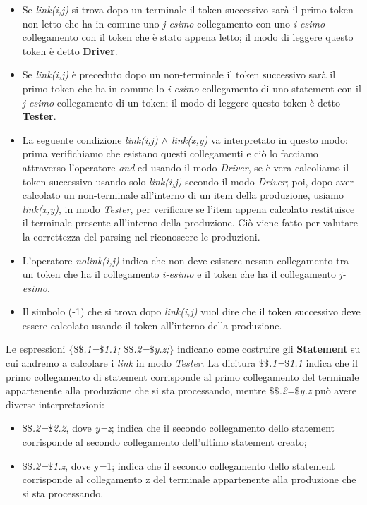 \begin{itemize}
	\item Se \textit{link(i,j)} si trova dopo un terminale il token successivo sarà il primo token non letto che ha in comune uno \textit{j-esimo} collegamento con uno \textit{i-esimo} collegamento con il token che è stato appena letto; il modo di leggere questo token è detto \textbf{Driver}.
	\item Se \textit{link(i,j)} è preceduto dopo un non-terminale il token successivo sarà il primo token che ha in comune lo \textit{i-esimo} collegamento di uno statement con il \textit{j-esimo} collegamento di un token; il modo di leggere questo token è detto \textbf{Tester}.
	\item La seguente condizione \textit{link(i,j) $\wedge$ link(x,y)} va interpretato in questo modo: prima verifichiamo che esistano questi collegamenti e ciò lo facciamo attraverso l'operatore \textit{and} ed usando il modo \textit{Driver}, se è vera calcoliamo il token successivo usando solo \textit{link(i,j)} secondo il modo \textit{Driver}; poi, dopo aver calcolato un non-terminale all'interno di un item della produzione, usiamo \textit{link(x,y)}, in modo \textit{Tester}, per verificare se l'item appena calcolato restituisce il terminale presente all'interno della produzione. Ciò viene fatto per valutare la correttezza del parsing nel riconoscere le produzioni.
	\item L'operatore \textit{nolink(i,j)} indica che non deve esistere nessun collegamento tra un token che ha il collegamento \textit{i-esimo} e il token che ha il collegamento \textit{j-esimo}.
	\item Il simbolo (-1) che si trova dopo \textit{link(i,j)} vuol dire che il token successivo deve essere calcolato usando il token all'interno della produzione.
\end{itemize} 
Le espressioni \textit{$\{$$\$\$$.1=$\$$1.1; $\$\$$.2=$\$$y.z;$\}$} indicano come costruire gli \textbf{Statement} su cui andremo a calcolare i \textit{link} in modo \textit{Tester}. La dicitura \textit{$\$\$$.1=$\$$1.1} indica che il primo collegamento di statement corrisponde al primo collegamento del terminale appartenente alla produzione che si sta processando, mentre \textit{$\$\$$.2=$\$$y.z} può avere diverse interpretazioni:
\begin{itemize}
	\item \textit{$\$\$$.2=$\$$2.2}, dove \textit{y=z}; indica che il secondo collegamento dello statement corrisponde al secondo collegamento dell'ultimo statement creato;
	\item \textit{$\$\$$.2=$\$$1.z}, dove y=1; indica che il secondo collegamento dello statement corrisponde al collegamento z del terminale appartenente alla produzione che si sta processando.
\end{itemize}
